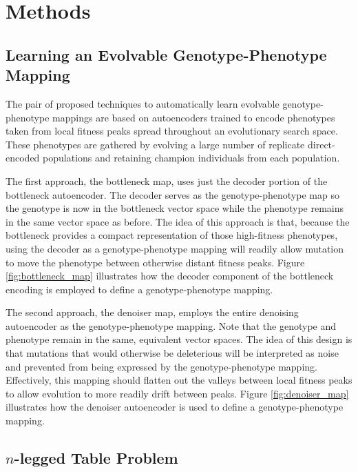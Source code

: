 \section{Methods} \label{sec:methods}

\subsection{Learning an Evolvable Genotype-Phenotype Mapping}

The pair of proposed techniques to automatically learn evolvable genotype-phenotype mappings are based on autoencoders trained to encode phenotypes taken from local fitness peaks spread throughout an evolutionary search space.
These phenotypes are gathered by evolving a large number of replicate direct-encoded populations and retaining champion individuals from each population.



The first approach, the bottleneck map, uses just the decoder portion of the bottleneck autoencoder.
The decoder serves as the genotype-phenotype map so the genotype is now in the bottleneck vector space while the phenotype remains in the same vector space as before.
The idea of this approach is that, because the bottleneck provides a compact representation of those high-fitness phenotypes, using the decoder as a genotype-phenotype mapping will readily allow mutation to move the phenotype between otherwise distant fitness peaks.
Figure \ref{fig:bottleneck_map} illustrates how the decoder component of the bottleneck encoding is employed to define a genotype-phenotype mapping.

The second approach, the denoiser map, employs the entire denoising autoencoder as the genotype-phenotype mapping.
Note that the genotype and phenotype remain in the same, equivalent vector spaces.
The idea of this design is that mutations that would otherwise be deleterious will be interpreted as noise and prevented from being expressed by the genotype-phenotype mapping.
Effectively, this mapping should flatten out the valleys between local fitness peaks to allow evolution to more readily drift between peaks.
Figure \ref{fig:denoiser_map} illustrates how the denoiser autoencoder is used to define a genotype-phenotype mapping.

\subsection{$n$-legged Table Problem}

